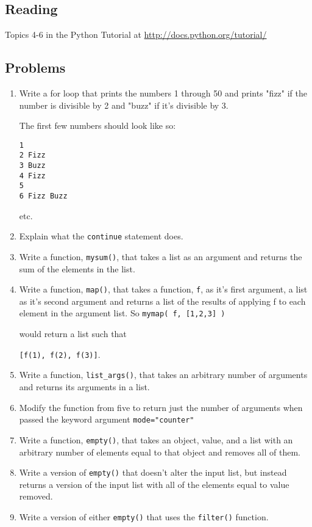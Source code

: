 \documentclass{report}
\begin{document}
\subsection{Reading}
Topics 4-6 in the Python Tutorial at \url{http://docs.python.org/tutorial/} \cite{website:Python272docs}
\subsection{Problems}
\begin{enumerate}
	\item Write a for loop that prints the numbers 1 through 50 and prints "fizz" if the number is divisible by 2 and "buzz" if it's divisible by 3.

The first few numbers should look like so:
\begin{verbatim}
1
2 Fizz
3 Buzz
4 Fizz
5
6 Fizz Buzz
\end{verbatim}
etc.

	\item Explain what the \verb|continue| statement does.
	\item Write a function, \verb|mysum()|, that takes a list as an argument and returns the sum of the elements in the list.
	\item Write a function, \verb|map()|, that takes a function, \verb|f|, as it's first argument, a list as it's second argument and returns a list of the results of applying f to each element in the argument list. So \verb|mymap( f, [1,2,3] )|

would return a list such that

\verb|[f(1), f(2), f(3)]|.

	\item Write a function, \verb|list_args()|, that takes an arbitrary number of arguments and returns its arguments in a list.
	\item Modify the function from five to return just the number of arguments when passed the keyword argument
\verb|mode="counter"|

	\item Write a function, \verb|empty()|, that takes an object, value, and a list with an arbitrary number of elements equal to that object and removes all of them.

	\item Write a version of \verb|empty()| that doesn't alter the input list, but instead returns a version of the input list with all of the elements equal to value removed.

	\item Write a version of either \verb|empty()| that uses the \verb|filter()| function.


\end{enumerate}
\end{document}
